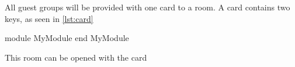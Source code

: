 \documentclass[Main]{subfiles}
\begin{document}
All guest groups will be provided with one card to a room.
A card contains two keys, as seen in \codeTitle \ref{lst:card}

\begin{vdmsl}[label=lst:card,caption="Card l. 8-9"]
  module MyModule
  end MyModule
\end{vdmsl}

This room can be opened with the card
\end{document}
